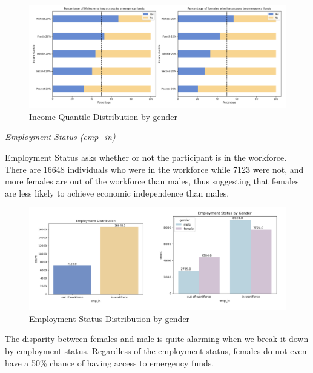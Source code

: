 \documentclass[12pt]{article}
\begin{document}
\begin{figure}

{\centering \includegraphics[width=1.1\linewidth]{graphs/employ_graph7} 

}

\caption{Income Quantile Distribution by gender}\label{fig:unnamed-chunk-8}
\end{figure}

\emph{Employment Status (emp\_in)}

Employment Status asks whether or not the participant is in the
workforce. There are 16648 individuals who were in the workforce while
7123 were not, and more females are out of the workforce than males,
thus suggesting that females are less likely to achieve economic
independence than males.

\begin{figure}

{\centering \includegraphics[width=1.1\linewidth]{graphs/employ_graph8} 

}

\caption{Employment Status Distribution by gender}\label{fig:unnamed-chunk-9}
\end{figure}

The disparity between females and male is quite alarming when we break
it down by employment status. Regardless of the employment status,
females do not even have a 50\% chance of having access to emergency
funds.
\end{document}

